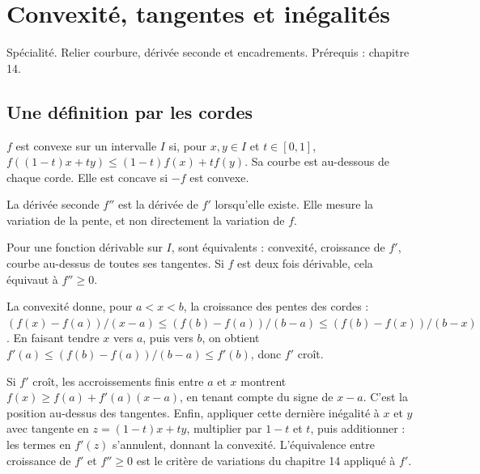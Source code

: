 \documentclass[../cours_tle.tex]{subfiles}
\begin{document}
\setcounter{chapter}{14}
\chapter{Convexité, tangentes et inégalités}
\label{ch:15}
\begin{objectif}
Spécialité. Relier courbure, dérivée seconde et encadrements. Prérequis : chapitre 14.
\end{objectif}
\section{Une définition par les cordes}
\begin{definition}
$f$ est convexe sur un intervalle $I$ si, pour $x,y\in I$ et $t\in[0,1]$,
$f((1-t)x+ty)\le(1-t)f(x)+tf(y)$.
Sa courbe est au-dessous de chaque corde. Elle est concave si $-f$ est convexe.
\end{definition}
La dérivée seconde $f''$ est la dérivée de $f'$ lorsqu'elle existe. Elle mesure la variation de la pente, et non directement la variation de $f$.
\begin{theoreme}
Pour une fonction dérivable sur $I$, sont équivalents : convexité, croissance de $f'$, courbe au-dessus de toutes ses tangentes. Si $f$ est deux fois dérivable, cela équivaut à $f''\ge0$.
\end{theoreme}
\begin{demonstration}
La convexité donne, pour $a<x<b$, la croissance des pentes des cordes :
$(f(x)-f(a))/(x-a)\le(f(b)-f(a))/(b-a)\le(f(b)-f(x))/(b-x)$.
En faisant tendre $x$ vers $a$, puis vers $b$, on obtient
$f'(a)\le(f(b)-f(a))/(b-a)\le f'(b)$, donc $f'$ croît.

Si $f'$ croît, les accroissements finis entre $a$ et $x$ montrent
$f(x)\ge f(a)+f'(a)(x-a)$, en tenant compte du signe de $x-a$. C'est la position au-dessus des tangentes.
Enfin, appliquer cette dernière inégalité à $x$ et $y$ avec tangente en $z=(1-t)x+ty$, multiplier par $1-t$ et $t$, puis additionner : les termes en $f'(z)$ s'annulent, donnant la convexité.
L'équivalence entre croissance de $f'$ et $f''\ge0$ est le critère de variations du chapitre 14 appliqué à $f'$.
\end{demonstration}
\end{document}

